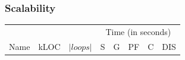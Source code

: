 \documentclass{beamer}
\begin{document}
\begin{frame}
\begin{figure}[h]
  \begin{center}
    
  \end{center} 
  \end{figure}
\end{frame}

\begin{frame}
	\frametitle{Scalability}

\begin{table}[!h]
	\centering
\begin{tabular}{|l|r|r||r|r|r|r|r|} \hline
	 	 & & &
        \multicolumn{5}{|c|}{Time (in seconds)} 
		\\ \cline{4-8}
		Name & kLOC & $ |loops| $ & S & G & PF & C & DIS \\ \hline
		
	\hline
\end{tabular}
\label{fig:projects}
\end{table}
 
\end{frame}
\end{document}
